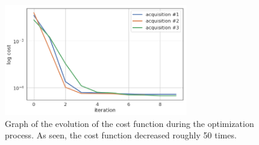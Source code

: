 \documentclass[conference]{IEEEtran}
\begin{document}
\begin{figure}
    \centering
    \includegraphics[width=8cm]{images/calibration-evolution.png}
    \caption{Graph of the evolution of the cost function during the optimization process. As seen, the cost function decreased roughly 50 times.}
    \label{table:iteration-results}
\end{figure}
\end{document}
